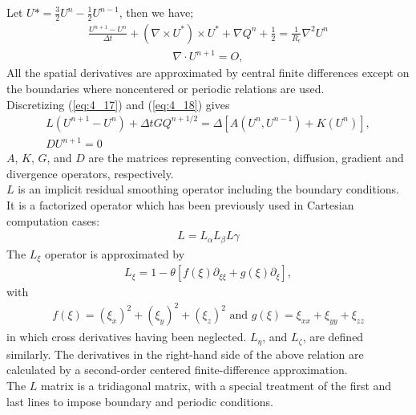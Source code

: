 \documentclass[11pt]{report}
\newcommand{\sps}{\\[0.2cm]}
\newcommand{\refn}[1]{(\ref{#1})}
\newcommand{\refx}[1]{\refn{eq:#1}}
\newcommand{\dsp}{\displaystyle}
\newcommand{\NI}{\noindent}
\begin{document}
	\NI Let $U*=\dsp\frac{3}{2}U^n - \frac{1}{2}U^{n-1}$, then we have;
	\begin{multline}
			\frac{U^{n+1} - U^n}{\Delta t} +\left(\nabla \times U^*\right)\times U^* + \nabla Q^n + \frac{1}{2} = \frac{1}{R_e}\nabla^2 U^{n}\label{eq:4_17}
	\end{multline}
	\begin{eqnarray}
		\nabla \cdot U^{n+1}=O,\label{eq:4_18}
	\end{eqnarray}
	All the spatial derivatives are approximated by central finite differences except on the boundaries where noncentered or periodic relations are used.\\
	Discretizing \refx{4_17} and \refx{4_18} gives
	\begin{gather}
		L(U^{n+1} - U^n) + \Delta t GQ^{n+1/2} = \Delta\left[A(U^n, U^{n-1})+K(U^n)\right],\label{eq:4_19}\sps
		DU^{n+1} = 0
	\end{gather}
	$A$, $K$, $G$, and $D$ are the matrices representing convection, diffusion, gradient and divergence operators, respectively.\\
	$L$ is an implicit residual smoothing operator including the boundary conditions. It is a
	factorized operator which has been previously used in Cartesian computation cases:
	\begin{eqnarray}
		L=L_\alpha L_\beta L\gamma
	\end{eqnarray}
	The $L_\xi$ operator is approximated by
	\begin{eqnarray*}
		L_\xi = 1-\theta[f(\xi)\partial_{\xi\xi}+g(\xi)\partial_\xi],
	\end{eqnarray*}
	with
	\begin{eqnarray*}
		f(\xi) = (\xi_x)^2 + (\xi_y)^2 + (\xi_z)^2 \text{ and } g(\xi) = \xi_{xx} + \xi_{yy} + \xi_{zz}
	\end{eqnarray*}
	in which cross derivatives having been neglected. $L_\eta$, and $L_\zeta$, are defined similarly. The derivatives in the right-hand side of the above relation are calculated by a second-order centered finite-difference approximation.\\
	
	\NI The $L$ matrix is a tridiagonal matrix, with a special treatment of the first and last lines to impose boundary and periodic conditions.\\
	
\end{document}
